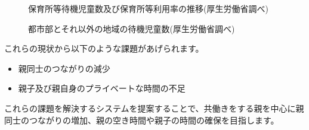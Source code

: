 \documentclass[a4j]{jarticle}
\begin{document}
\begin{figure}[H]
\begin{center}
\caption{保育所等待機児童数及び保育所等利用率の推移(厚生労働省調べ)}
\label{fig:2}
\end{center}
\end{figure}

\begin{figure}[H]
\begin{center}
\caption{都市部とそれ以外の地域の待機児童数(厚生労働省調べ)}
\label{fig:3}
\end{center}
\end{figure}

これらの現状から以下のような課題があげられます。

\begin{itemize}
\item 親同士のつながりの減少
\item 親子及び親自身のプライベートな時間の不足
\end{itemize}

これらの課題を解決するシステムを提案することで、共働きをする親を中心に親同士のつながりの増加、親の空き時間や親子の時間の確保を目指します。
\end{document}

